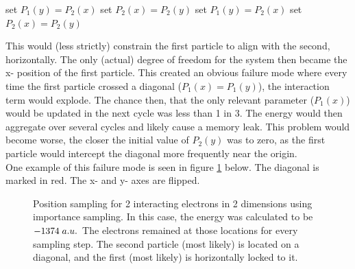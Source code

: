 \documentclass[11pt,a4paper,titlepage]{article}
\begin{document}
\begin{algorithm}[H]
\SetAlgoLined
{}
set $P_1(y) = P_2(x)$\;
set $P_2(x) = P_2(y)$\;
set $P_1(y) = P_2(x)$\;
set $P_2(x) = P_2(y)$\;
\end{algorithm}
This would (less strictly) constrain the first particle to align with the second, horizontally. The only (actual) degree of freedom for the system then became the x- position of the first particle. This created an obvious failure mode where every time the first particle crossed a diagonal ($P_1(x) = P_1(y)$), the interaction term would explode. The chance then, that the only relevant parameter ($P_1(x)$) would be updated in the next cycle was less than 1 in 3. The energy would then aggregate over several cycles and likely cause a memory leak. This problem would become worse, the closer the initial value of $P_2(y)$ was to zero, as the first particle would intercept the diagonal more frequently near the origin.\\One example of this failure mode is seen in figure \ref{fig:posSampling_unstable} below. The diagonal is marked in red. The x- and y- axes are flipped.
\begin{figure}[H]
\center
{}
\caption[numerically unstable run- electron positions]{Position sampling for 2 interacting electrons in 2 dimensions using importance sampling. In this case, the energy was calculated to be $-1374\hspace{1mm} a.u.$ The electrons remained at those locations for every sampling step. The second particle (most likely) is located on a diagonal, and the first (most likely) is horizontally locked to it.}
\label{fig:posSampling_unstable}
\end{figure}
\end{document}
